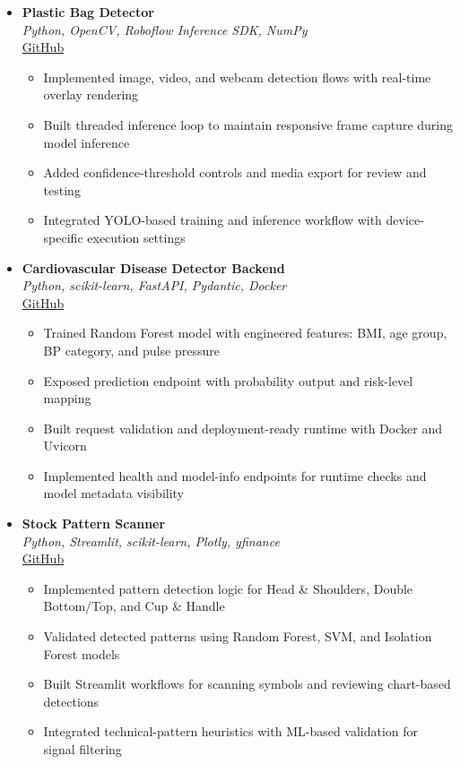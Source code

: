 \documentclass[11pt,a4paper]{article}
\newcommand{\resumeItem}[1]{
  \item\small{#1 \vspace{-1pt}}
}
\begin{document}
\begin{itemize}[leftmargin=*]
\item \textbf{Plastic Bag Detector} \\
\textit{Python, OpenCV, Roboflow Inference SDK, NumPy} \\
\href{https://github.com/Dhairya3391/plastic-detector}{GitHub}
\begin{itemize}[leftmargin=*]
  \resumeItem{Implemented image, video, and webcam detection flows with real-time overlay rendering}
  \resumeItem{Built threaded inference loop to maintain responsive frame capture during model inference}
  \resumeItem{Added confidence-threshold controls and media export for review and testing}
  \resumeItem{Integrated YOLO-based training and inference workflow with device-specific execution settings}
\end{itemize}

\item \textbf{Cardiovascular Disease Detector Backend} \\
\textit{Python, scikit-learn, FastAPI, Pydantic, Docker} \\
\href{https://github.com/Dhairya3391/Cardiovascular-Disease-Detector-Backend}{GitHub}
\begin{itemize}[leftmargin=*]
  \resumeItem{Trained Random Forest model with engineered features: BMI, age group, BP category, and pulse pressure}
  \resumeItem{Exposed prediction endpoint with probability output and risk-level mapping}
  \resumeItem{Built request validation and deployment-ready runtime with Docker and Uvicorn}
  \resumeItem{Implemented health and model-info endpoints for runtime checks and model metadata visibility}
\end{itemize}

\item \textbf{Stock Pattern Scanner} \\
\textit{Python, Streamlit, scikit-learn, Plotly, yfinance} \\
\href{https://github.com/Dhairya3391/stock-pattern-scanner}{GitHub}
\begin{itemize}[leftmargin=*]
  \resumeItem{Implemented pattern detection logic for Head \& Shoulders, Double Bottom/Top, and Cup \& Handle}
  \resumeItem{Validated detected patterns using Random Forest, SVM, and Isolation Forest models}
  \resumeItem{Built Streamlit workflows for scanning symbols and reviewing chart-based detections}
  \resumeItem{Integrated technical-pattern heuristics with ML-based validation for signal filtering}
\end{itemize}

\end{itemize}
\end{document}
